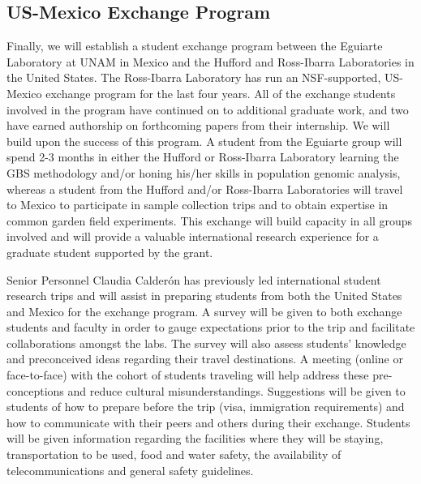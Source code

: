 \subsection*{US-Mexico Exchange Program}
	
Finally, we will establish a student exchange program between the Eguiarte Laboratory at UNAM in Mexico and the Hufford and Ross-Ibarra Laboratories in the United States. The Ross-Ibarra Laboratory has run an NSF-supported, US-Mexico exchange program for the last four years.  All of the exchange students involved in the program have continued on to additional graduate work, and two have earned authorship on forthcoming papers from their internship.  We will build upon the success of this program.  A student from the Eguiarte group will spend 2-3 months in either the Hufford or Ross-Ibarra Laboratory learning the GBS methodology and/or honing his/her skills in population genomic analysis, whereas a student from the Hufford and/or Ross-Ibarra Laboratories will travel to Mexico to participate in sample collection trips and to obtain expertise in common garden field experiments. This exchange will build capacity in all groups involved and will provide a valuable international research experience for a graduate student supported by the grant.  

Senior Personnel Claudia Calder\'{o}n has previously led international student research trips and will assist in preparing students from both the United States and Mexico for the exchange program. A survey will be given to both exchange students and faculty in order to gauge expectations prior to the trip and facilitate collaborations amongst the labs.  The survey will also assess students' knowledge and preconceived ideas  regarding their travel destinations.  A meeting (online or face-to-face) with the cohort of students traveling will help address these pre-conceptions and reduce cultural misunderstandings.  Suggestions will be given to students of how to prepare before the trip (visa, immigration requirements) and how to communicate with their peers and others during their exchange.  Students will be given information regarding the facilities where they will be staying, transportation to be used, food and water safety, the availability of telecommunications and general safety guidelines.


